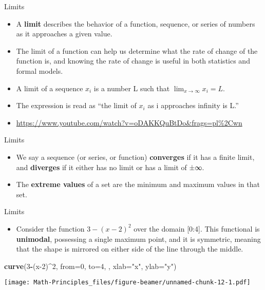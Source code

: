 \documentclass[
  ignorenonframetext,
]{beamer}
\newenvironment{Shaded}{\begin{snugshade}}{\end{snugshade}}
\newcommand{\DataTypeTok}[1]{\textcolor[rgb]{0.13,0.29,0.53}{#1}}
\newcommand{\DecValTok}[1]{\textcolor[rgb]{0.00,0.00,0.81}{#1}}
\newcommand{\KeywordTok}[1]{\textcolor[rgb]{0.13,0.29,0.53}{\textbf{#1}}}
\newcommand{\NormalTok}[1]{#1}
\newcommand{\OperatorTok}[1]{\textcolor[rgb]{0.81,0.36,0.00}{\textbf{#1}}}
\newcommand{\StringTok}[1]{\textcolor[rgb]{0.31,0.60,0.02}{#1}}
\providecommand{\tightlist}{%
  \setlength{\itemsep}{0pt}\setlength{\parskip}{0pt}}
\begin{document}
\begin{frame}{Limits}
\protect\hypertarget{limits}{}

\begin{itemize}
\item
  A \textbf{limit} describes the behavior of a function, sequence, or
  series of numbers as it approaches a given value.
\item
  The limit of a function can help us determine what the rate of change
  of the function is, and knowing the rate of change is useful in both
  statistics and formal models.
\item
  A limit of a sequence \(x_{i}\) is a number L such that
  \(\lim_{x \to \infty}x_{i} = L\).
\item
  The expression is read as ``the limit of \(x_{i}\) as i approaches
  infinity is L.''
\item
  \url{https://www.youtube.com/watch?v=oDAKKQuBtDo\&frags=pl\%2Cwn}
\end{itemize}

\end{frame}

\begin{frame}{Limits}
\protect\hypertarget{limits-1}{}

\begin{itemize}
\item
  We say a sequence (or series, or function) \textbf{converges} if it
  has a finite limit, and \textbf{diverges} if it either has no limit or
  has a limit of ±∞.
\item
  The \textbf{extreme values} of a set are the minimum and maximum
  values in that set.
\end{itemize}

\end{frame}

\begin{frame}[fragile]{Limits}
\protect\hypertarget{limits-2}{}

\begin{itemize}
\tightlist
\item
  Consider the function \(3- (x-2)^{2}\) over the domain {[}0:4{]}. This
  functional is \textbf{unimodal}, possessing a single maximum point,
  and it is symmetric, meaning that the shape is mirrored on either side
  of the line through the middle.
\end{itemize}

\begin{Shaded}
\begin{Highlighting}[]
\KeywordTok{curve}\NormalTok{(}\DecValTok{3}\OperatorTok{-}\NormalTok{(x}\DecValTok{-2}\NormalTok{)}\OperatorTok{^}\DecValTok{2}\NormalTok{, }\DataTypeTok{from=}\DecValTok{0}\NormalTok{, }\DataTypeTok{to=}\DecValTok{4}\NormalTok{, , }\DataTypeTok{xlab=}\StringTok{"x"}\NormalTok{, }\DataTypeTok{ylab=}\StringTok{"y"}\NormalTok{)}
\end{Highlighting}
\end{Shaded}

\texttt{[image: Math-Principles\_files/figure-beamer/unnamed-chunk-12-1.pdf]}

\end{frame}
\end{document}
